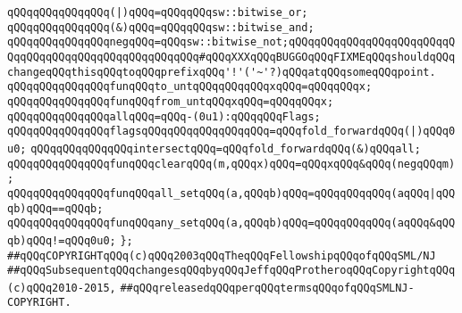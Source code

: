 \verb|qQQqqQQqqQQqqQQq(|\verb#|)qQQq=qQQqqQQqsw::bitwise_or;#\newline
\verb|qQQqqQQqqQQqqQQq(&)qQQq=qQQqqQQqsw::bitwise_and;|\newline
\newline
\verb|qQQqqQQqqQQqqQQqnegqQQq=qQQqsw::bitwise_not;qQQqqQQqqQQqqQQqqQQqqQQqqQQqqQQqqQQqqQQqqQQqqQQqqQQqqQQq#qQQqXXXqQQqBUGGOqQQqFIXMEqQQqshouldqQQqchangeqQQqthisqQQqtoqQQqprefixqQQq'!'('~'?)qQQqatqQQqsomeqQQqpoint.|\newline
\newline
\verb|qQQqqQQqqQQqqQQqfunqQQqto_untqQQqqQQqqQQqxqQQq=qQQqqQQqx;|\newline
\verb|qQQqqQQqqQQqqQQqfunqQQqfrom_untqQQqxqQQq=qQQqqQQqx;|\newline
\newline
\verb|qQQqqQQqqQQqqQQqallqQQq=qQQq-(0u1):qQQqqQQqFlags;|\newline
\newline
\verb|qQQqqQQqqQQqqQQqflagsqQQqqQQqqQQqqQQqqQQq=qQQqfold_forwardqQQq(|\verb#|)qQQq0u0;#\newline
\verb|qQQqqQQqqQQqqQQqintersectqQQq=qQQqfold_forwardqQQq(&)qQQqall;|\newline
\newline
\verb|qQQqqQQqqQQqqQQqfunqQQqclearqQQq(m,qQQqx)qQQq=qQQqxqQQq&qQQq(negqQQqm);|\newline
\newline
\verb|qQQqqQQqqQQqqQQqfunqQQqall_setqQQq(a,qQQqb)qQQq=qQQqqQQqqQQq(aqQQq|\verb#|qQQqb)qQQq==qQQqb;#\newline
\verb|qQQqqQQqqQQqqQQqfunqQQqany_setqQQq(a,qQQqb)qQQq=qQQqqQQqqQQq(aqQQq&qQQqb)qQQq!=qQQq0u0;|\newline
\newline
\verb|};|\newline
\newline
\newline
\verb|##qQQqCOPYRIGHTqQQq(c)qQQq2003qQQqTheqQQqFellowshipqQQqofqQQqSML/NJ|\newline
\verb|##qQQqSubsequentqQQqchangesqQQqbyqQQqJeffqQQqProtheroqQQqCopyrightqQQq(c)qQQq2010-2015,|\newline
\verb|##qQQqreleasedqQQqperqQQqtermsqQQqofqQQqSMLNJ-COPYRIGHT.|\newline

